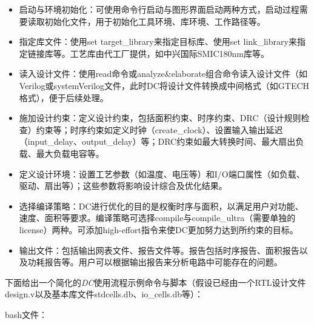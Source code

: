 \begin{itemize}
\tightlist
\item
  启动与环境初始化：可使用命令行启动与图形界面启动两种方式，启动过程需要读取初始化文件，用于初始化工具环境、库环境、工作路径等。
\item
  指定库文件：使用set target\_library来指定目标库、使用set
  link\_library来指定链接库等。工艺库由代工厂提供，如中兴国际SMIC180nm库等。
\item
  读入设计文件：使用read命令或analyze\&elaborate组合命令读入设计文件（如Verilog或systemVerilog文件，此时DC将设计文件转换成中间格式（如GTECH格式），便于后续处理。
\item
  施加设计约束：定义设计约束，包括面积约束、时序约束、DRC（设计规则检查）约束等；时序约束如定义时钟（create\_clock）、设置输入输出延迟（input\_delay、output\_delay）等；DRC约束如最大转换时间、最大扇出负载、最大负载电容等。
\item
  定义设计环境：设置工艺参数（如温度、电压等）和I/O端口属性（如负载、驱动、扇出等）；这些参数将影响设计综合及优化结果。
\item
  选择编译策略：DC进行优化的目的是权衡时序与面积，以满足用户对功能、速度、面积等要求。编译策略可选择compile与compile\_ultra（需要单独的license）两种。可添加high-effort指令来使DC更加努力达到所约束的目标。
\item
  输出文件：包括输出网表文件、报告文件等。报告包括时序报告、面积报告以及功耗报告等。用户可以根据输出报告来分析电路中可能存在的问题。
\end{itemize}

下面给出一个简化的\emph{DC}使用流程示例命令与脚本（假设已经由一个RTL设计文件design.v以及基本库文件stdcells.db、io\_cells.db等）：

bash文件：


